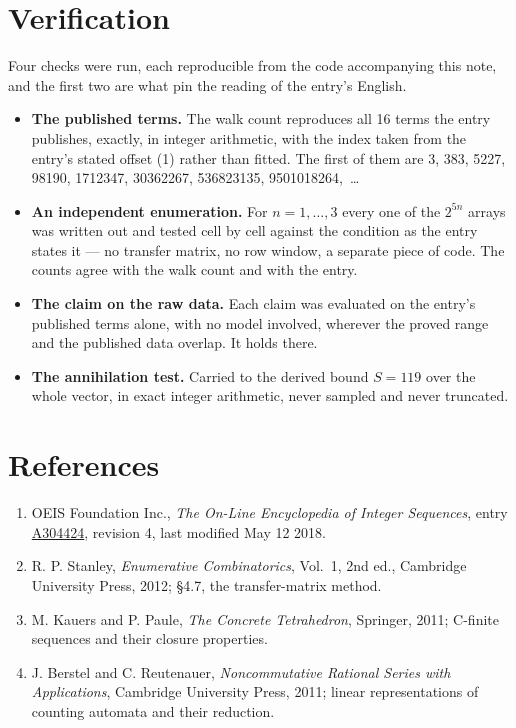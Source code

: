 \documentclass[11pt]{article}
\theoremstyle{definition}
\begin{document}
\section{Verification}

Four checks were run, each reproducible from the code accompanying this note, and the first two are what pin the reading of the entry's English.

\begin{itemize}

\item {\bfseries The published terms.} The walk count reproduces all 16 terms the entry publishes, exactly, in integer arithmetic, with the index taken from the entry's stated offset (1) rather than fitted. The first of them are 3, 383, 5227, 98190, 1712347, 30362267, 536823135, 9501018264,~\dots

\item {\bfseries An independent enumeration.} For $n = 1,\dots,3$ every one of the $2^{5n}$ arrays was written out and tested cell by cell against the condition as the entry states it --- no transfer matrix, no row window, a separate piece of code. The counts agree with the walk count and with the entry.

\item {\bfseries The claim on the raw data.} Each claim was evaluated on the entry's published terms alone, with no model involved, wherever the proved range and the published data overlap. It holds there.

\item {\bfseries The annihilation test.} Carried to the derived bound $S = 119$ over the whole vector, in exact integer arithmetic, never sampled and never truncated.

\end{itemize}

\section{References}

\begin{enumerate}

\item OEIS Foundation Inc., \emph{The On-Line Encyclopedia of Integer Sequences}, entry \href{https://oeis.org/A304424}{A304424}, revision 4, last modified May 12 2018.

\item R. P. Stanley, \emph{Enumerative Combinatorics}, Vol.~1, 2nd ed., Cambridge University Press, 2012; \S4.7, the transfer-matrix method.

\item M. Kauers and P. Paule, \emph{The Concrete Tetrahedron}, Springer, 2011; C-finite sequences and their closure properties.

\item J. Berstel and C. Reutenauer, \emph{Noncommutative Rational Series with Applications}, Cambridge University Press, 2011; linear representations of counting automata and their reduction.

\end{enumerate}
\end{document}
